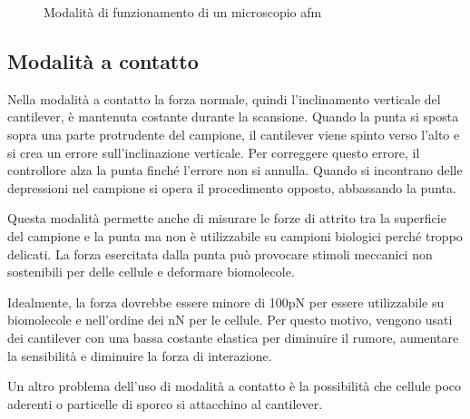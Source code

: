 \documentclass[../main.tex]{subfiles}
\begin{document}
\begin{figure}[h]
\begin{subfigure}{0.32\linewidth}
\end{subfigure}
\caption[Modalità di funzionamento di un microscopio AFM]{
	Modalità di funzionamento di un microscopio \acrshort{afm}}
\label{fig:afm_modes}
\end{figure}

\subsection{Modalità a contatto} \label{s:afm_contact}

Nella modalità a contatto la forza normale, quindi l'inclinamento verticale del cantilever, è mantenuta costante durante la scansione. Quando la punta si sposta sopra una parte protrudente del campione, il cantilever viene spinto verso l'alto e si crea un errore sull'inclinazione verticale. Per correggere questo errore, il controllore alza la punta finché l'errore non si annulla. Quando si incontrano delle depressioni nel campione si opera il procedimento opposto, abbassando la punta.

Questa modalità permette anche di misurare le forze di attrito tra la superficie del campione e la punta ma non è utilizzabile su campioni biologici perché troppo delicati. La forza esercitata dalla punta può provocare stimoli meccanici non sostenibili per delle cellule e deformare biomolecole.\cite{zhong_1993}

Idealmente, la forza dovrebbe essere minore di 100pN per essere utilizzabile su biomolecole e nell'ordine dei nN per le cellule. Per questo motivo, vengono usati dei cantilever con una bassa costante elastica per diminuire il rumore, aumentare la sensibilità e diminuire la forza di interazione.\cite{wang_2018}

Un altro problema dell'uso di modalità a contatto è la possibilità che cellule poco aderenti o particelle di sporco si attacchino al cantilever.
\end{document}
